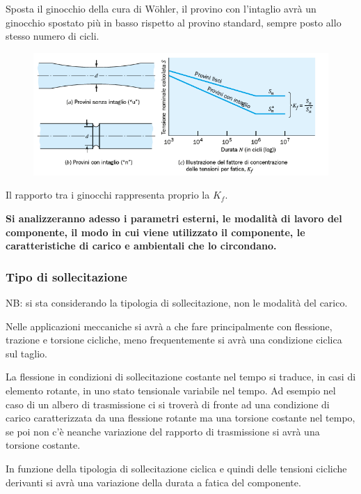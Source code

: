 			 Sposta il ginocchio della cura di Wöhler, il provino con l'intaglio avrà un ginocchio spostato più  in  basso rispetto al provino standard, sempre posto allo stesso numero di cicli. 
			 
			 \begin{figure}[H]
			 	\centering
			 	\includegraphics[width=0.5\linewidth]{immagini_10/screenshot027}
			 	\label{fig:screenshot027}
			 \end{figure}			 
			 
			 Il rapporto tra i ginocchi rappresenta proprio la $K_f$. \newline
			
			 \vspace{1cm}			   
			 \begin{center}
			 	\textbf{Si analizzeranno adesso i parametri esterni, le modalità di lavoro del componente, il modo in cui viene utilizzato il componente, le caratteristiche di carico e ambientali che lo circondano.} 
			 \end{center}
			 \vspace{1cm}
			 
\subsubsection{Tipo di sollecitazione}
			 NB: si sta considerando la tipologia di sollecitazione, non le modalità del carico. 
			 
			 Nelle applicazioni meccaniche si avrà a che fare principalmente con flessione, trazione e torsione  cicliche, meno frequentemente si avrà una condizione ciclica sul taglio. \newline 
			 
			 La flessione in condizioni di sollecitazione costante nel tempo si traduce, in casi di elemento rotante, in uno stato tensionale variabile nel tempo. Ad esempio nel caso di un albero di trasmissione ci si troverà di fronte ad una condizione di carico caratterizzata da una flessione rotante ma una torsione costante nel tempo, se poi non c'è neanche variazione del rapporto di trasmissione si avrà una torsione costante.
			 
			 In funzione della tipologia di sollecitazione ciclica e quindi delle tensioni cicliche derivanti si avrà una variazione della durata a fatica del componente. \newline
			 
